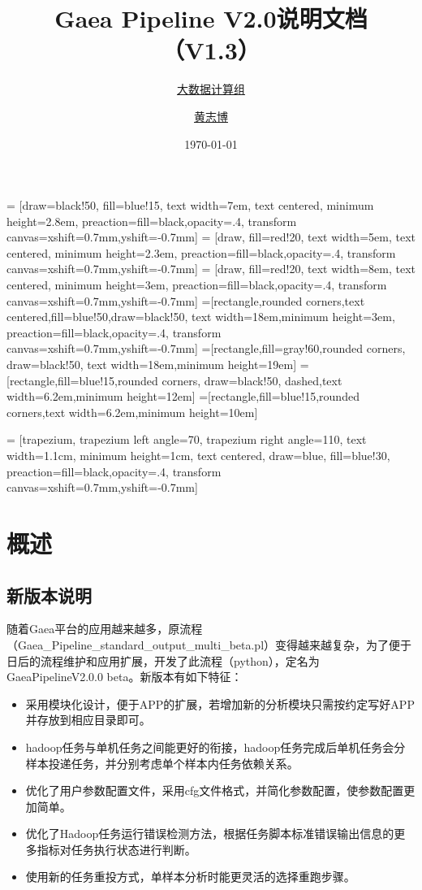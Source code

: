 \documentclass[UTF8,10pt,a4paper]{ctexart}
\title{Gaea Pipeline V2.0说明文档{\small （V1.3）}}
\author{\href{http://bigdata.genomics.cn/}{大数据计算组} \and 
\href{mailto:huangzhibo@genomics.cn}{黄志博}}
\date{\today}
\begin{document}
\maketitle
\tableofcontents
\newpage
\setlength{\parskip}{1ex plus 0.5ex minus 0.2ex}

= [draw=black!50, fill=blue!15, text width=7em,  text centered, minimum height=2.8em, preaction={fill=black,opacity=.4,
transform canvas={xshift=0.7mm,yshift=-0.7mm}}]
= [draw, fill=red!20, text width=5em,  text centered, minimum height=2.3em, preaction={fill=black,opacity=.4,
transform canvas={xshift=0.7mm,yshift=-0.7mm}}]
= [draw, fill=red!20, text width=8em,  text centered, minimum height=3em, preaction={fill=black,opacity=.4,
transform canvas={xshift=0.7mm,yshift=-0.7mm}}]
=[rectangle,rounded corners,text centered,fill=blue!50,draw=black!50, text width=18em,minimum height=3em,
preaction={fill=black,opacity=.4,
transform canvas={xshift=0.7mm,yshift=-0.7mm}}]
=[rectangle,fill=gray!60,rounded corners, draw=black!50, text width=18em,minimum height=19em]
=[rectangle,fill=blue!15,rounded corners, draw=black!50, dashed,text width=6.2em,minimum height=12em]
=[rectangle,fill=blue!15,rounded corners,text width=6.2em,minimum height=10em]

 = [trapezium, trapezium left angle=70, trapezium right angle=110, text width=1.1cm, minimum height=1cm, text centered, draw=blue, fill=blue!30,
preaction={fill=black,opacity=.4,
transform canvas={xshift=0.7mm,yshift=-0.7mm}}]

\section{概述}
\label{sec:1}


\subsection{新版本说明}
随着Gaea平台的应用越来越多，原流程（Gaea\_Pipeline\_standard\_output\_multi\_beta.pl）变得越来越复杂，为了便于日后的流程维护和应用扩展，开发了此流程（python），定名为GaeaPipelineV2.0.0 beta。新版本有如下特征：
\begin{itemize}
\item 采用模块化设计，便于APP的扩展，若增加新的分析模块只需按约定写好APP并存放到相应目录即可。
\item hadoop任务与单机任务之间能更好的衔接，hadoop任务完成后单机任务会分样本投递任务，并分别考虑单个样本内任务依赖关系。
\item 优化了用户参数配置文件，采用cfg文件格式，并简化参数配置，使参数配置更加简单。
\item 优化了Hadoop任务运行错误检测方法，根据任务脚本标准错误输出信息的更多指标对任务执行状态进行判断。
\item 使用新的任务重投方式，单样本分析时能更灵活的选择重跑步骤。
\end{itemize}
\end{document}
